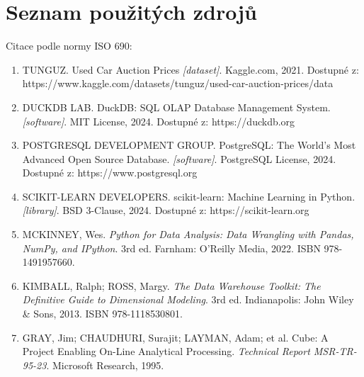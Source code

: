\documentclass[12pt,a4paper]{article}
\begin{document}
\newpage

\section{Seznam použitých zdrojů}

Citace podle normy ISO 690:

\begin{enumerate}
    \item 
    TUNGUZ. Used Car Auction Prices \textit{[dataset]}. Kaggle.com, 2021. 
    Dostupné z: https://www.kaggle.com/datasets/tunguz/used-car-auction-prices/data
    
    \item 
    DUCKDB LAB. DuckDB: SQL OLAP Database Management System. \textit{[software]}. MIT License, 2024.
    Dostupné z: https://duckdb.org
    
    \item 
    POSTGRESQL DEVELOPMENT GROUP. PostgreSQL: The World's Most Advanced Open Source Database. 
    \textit{[software]}. PostgreSQL License, 2024.
    Dostupné z: https://www.postgresql.org
    
    \item 
    SCIKIT-LEARN DEVELOPERS. scikit-learn: Machine Learning in Python. \textit{[library]}. BSD 3-Clause, 2024.
    Dostupné z: https://scikit-learn.org
    
    \item 
    MCKINNEY, Wes. \textit{Python for Data Analysis: Data Wrangling with Pandas, NumPy, 
    and IPython}. 3rd ed. Farnham: O'Reilly Media, 2022. ISBN 978-1491957660.
    
    \item 
    KIMBALL, Ralph; ROSS, Margy. \textit{The Data Warehouse Toolkit: The Definitive Guide 
    to Dimensional Modeling}. 3rd ed. Indianapolis: John Wiley \& Sons, 2013. 
    ISBN 978-1118530801.
    
    \item 
    GRAY, Jim; CHAUDHURI, Surajit; LAYMAN, Adam; et al. Cube: A Project Enabling On-Line 
    Analytical Processing. \textit{Technical Report MSR-TR-95-23}. Microsoft Research, 1995.
    
\end{enumerate}
\end{document}
